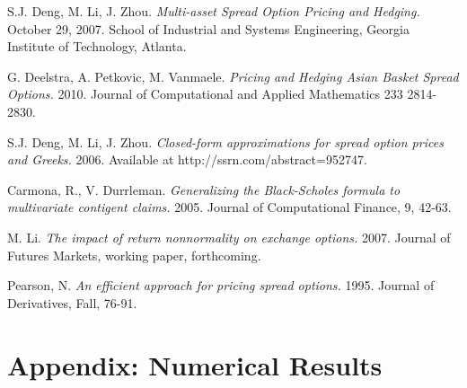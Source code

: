 \documentclass[a4paper]{article}
\begin{document}
\newpage
\begin{thebibliography}{1}
S.J. Deng, M. Li, J. Zhou.
\textit{Multi-asset Spread Option Pricing and Hedging.}
October 29, 2007. School of Industrial and Systems Engineering, Georgia Institute of Technology, Atlanta.

G. Deelstra, A. Petkovic, M. Vanmaele.
\textit{Pricing and Hedging Asian Basket Spread Options.}
2010. Journal of Computational and Applied Mathematics 233 2814-2830.

S.J. Deng, M. Li,  J. Zhou. 
\textit{Closed-form approximations for spread option prices and Greeks.} 2006.
Available at http://ssrn.com/abstract=952747.

Carmona, R., V. Durrleman. 
\textit{Generalizing the Black-Scholes formula to multivariate contigent claims.} 2005. Journal of Computational Finance, 9, 42-63.

M. Li.
\textit{The impact of return nonnormality on exchange options.} 2007.
Journal of Futures Markets, working paper, forthcoming.

Pearson, N. 
\textit{An efficient approach for pricing spread options.} 1995. Journal of Derivatives, Fall, 76-91.

\end{thebibliography}

\newpage
\section*{Appendix: Numerical Results}
%
\label{sec:appendix}
\end{document}

